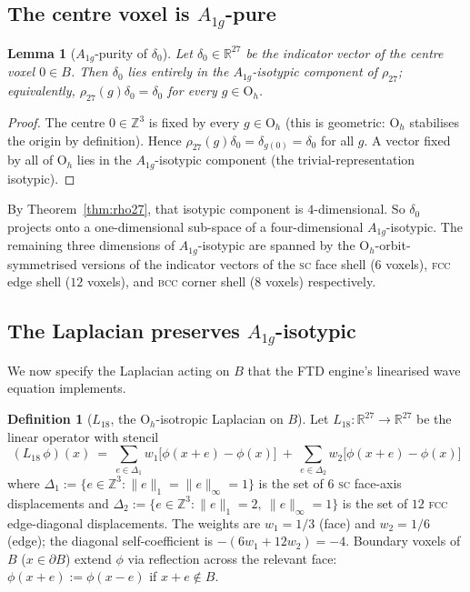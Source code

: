 \documentclass[11pt,reqno]{amsart}
\theoremstyle{plain}
\newtheorem{lemma}[theorem]{Lemma}
\theoremstyle{definition}
\newtheorem{definition}[theorem]{Definition}
\theoremstyle{remark}
\numberwithin{equation}{section}
\newcommand{\Ohgrp}{\mathrm{O}_h}
\newcommand{\Aoneg}{A_{1g}}
\begin{document}
\subsection{The centre voxel is $\Aoneg$-pure}

\begin{lemma}[$\Aoneg$-purity of $\delta_{0}$]
\label{lem:apure}
Let $\delta_{0} \in \mathbb{R}^{27}$ be the indicator vector of the
centre voxel $0 \in B$. Then $\delta_{0}$ lies entirely in the
$\Aoneg$-isotypic component of $\rho_{27}$; equivalently,
$\rho_{27}(g)\delta_{0} = \delta_{0}$ for every $g \in \Ohgrp$.
\end{lemma}

\begin{proof}
The centre $0 \in \mathbb{Z}^{3}$ is fixed by every $g \in \Ohgrp$
(this is geometric: $\Ohgrp$ stabilises the origin by definition).
Hence $\rho_{27}(g)\delta_{0} = \delta_{g(0)} = \delta_{0}$ for all
$g$. A vector fixed by all of $\Ohgrp$ lies in the $\Aoneg$-isotypic
component (the trivial-representation isotypic).
\end{proof}

By Theorem~\ref{thm:rho27}, that isotypic component is
$4$-dimensional. So $\delta_{0}$ projects onto a one-dimensional
sub-space of a four-dimensional $\Aoneg$-isotypic. The remaining
three dimensions of $\Aoneg$-isotypic are spanned by the
$\Ohgrp$-orbit-symmetrised versions of the indicator vectors of the
\textsc{sc} face shell ($6$ voxels), \textsc{fcc} edge shell ($12$
voxels), and \textsc{bcc} corner shell ($8$ voxels) respectively.

\subsection{The Laplacian preserves $\Aoneg$-isotypic}
\label{sec:bridge:laplacian}

We now specify the Laplacian acting on $B$ that the FTD engine's
linearised wave equation implements.

\begin{definition}[$L_{18}$, the $\Ohgrp$-isotropic Laplacian on $B$]
\label{def:L18}
Let $L_{18}\colon \mathbb{R}^{27} \to \mathbb{R}^{27}$ be the
linear operator with stencil
\[
  (L_{18}\,\phi)(x)\ =\ \sum_{e \in \Delta_{1}} w_{1}\bigl[\phi(x+e) - \phi(x)\bigr]
                       \ +\ \sum_{e \in \Delta_{2}} w_{2}\bigl[\phi(x+e) - \phi(x)\bigr]
\]
where $\Delta_{1} := \{e \in \mathbb{Z}^{3} : \|e\|_{1} = \|e\|_{\infty} = 1\}$
is the set of $6$ \textsc{sc} face-axis displacements and
$\Delta_{2} := \{e \in \mathbb{Z}^{3} : \|e\|_{1} = 2,\ \|e\|_{\infty} = 1\}$
is the set of $12$ \textsc{fcc} edge-diagonal displacements. The
weights are $w_{1} = 1/3$ (face) and $w_{2} = 1/6$ (edge); the
diagonal self-coefficient is $-(6 w_{1} + 12 w_{2}) = -4$. Boundary
voxels of $B$ ($x \in \partial B$) extend $\phi$ via reflection
across the relevant face: $\phi(x + e) := \phi(x - e)$ if $x + e
\notin B$.
\end{definition}
\end{document}
